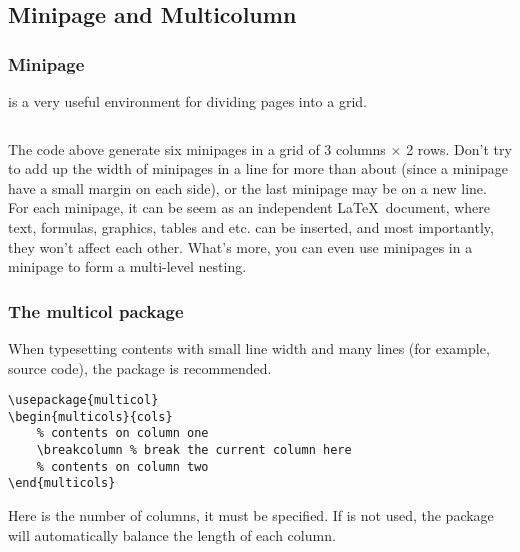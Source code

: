 \subsection{Minipage and Multicolumn}

\begin{frame}[fragile]
    \frametitle{Minipage}
     is a very useful environment for dividing pages into a grid.
    \begin{example}
        \begin{multicols}{2}
            \inputminted[xleftmargin=1.5em]{latex}{../text/minipage.tex}
        \end{multicols}
    \end{example}
\end{frame}

\begin{frame}
    The code above generate six minipages in a grid of 3 columns $\times$ 2 rows. Don't try to add up the width of minipages in a line for more than about  (since a minipage have a small margin on each side), or the last minipage may be on a new line. \\[0.5em]
    For each minipage, it can be seem as an independent \LaTeX\ document, where text, formulas, graphics, tables and etc. can be inserted, and most importantly, they won't affect each other. What's more, you can even use minipages in a minipage to form a multi-level nesting. \\
\end{frame}

\begin{frame}[fragile]
    \frametitle{The multicol package}
    When typesetting contents with small line width and many lines (for example, source code), the  package is recommended.
    \begin{command}
        \begin{verbatim}
\usepackage{multicol}
\begin{multicols}{cols}
    % contents on column one
    \breakcolumn % break the current column here
    % contents on column two
\end{multicols}
		\end{verbatim}
    \end{command}
    Here  is the number of columns, it must be specified. If \LC{\breakcolumn} is not used, the  package will automatically balance the length of each column.
\end{frame}
